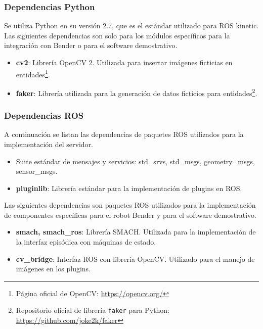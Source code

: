 \subsubsection{Dependencias Python}

Se utiliza Python en su versión 2.7, que es el estándar utilizado para ROS kinetic. Las siguientes dependencias son solo para los módulos específicos para la integración con Bender o para el software demostrativo.

\begin{itemize}
\item {\bfseries cv2}: Librería OpenCV 2. Utilizada para insertar imágenes ficticias en entidades\footnote{Página oficial de OpenCV: \url{https://opencv.org/}}. 
\item {\bfseries faker}: Librería utilizada para la generación de datos ficticios para entidades\footnote{Repositorio oficial de librería \texttt{faker} para Python: \url{https://github.com/joke2k/faker}}.
\end{itemize}


\subsubsection{Dependencias ROS}

A continuación se listan las dependencias de paquetes ROS utilizados para la implementación del servidor.
\begin{itemize}
	\item Suite estándar de mensajes y servicios: std\_srvs, std\_msgs, geometry\_msgs, sensor\_msgs.
	\item {\bfseries pluginlib}: Librería estándar para la implementación de plugins en ROS.
\end{itemize}

Las siguientes dependencias son paquetes ROS utilizados para la implementación de componentes específicas para el robot Bender y para el software demostrativo.
\begin{itemize}
\item {\bfseries smach, smach\_ros}: Librería SMACH. Utilizada para la implementación de la interfaz episódica con máquinas de estado.
\item {\bfseries cv\_bridge}: Interfaz ROS con librería OpenCV. Utilizado para el manejo de imágenes en los plugins.
\end{itemize}


